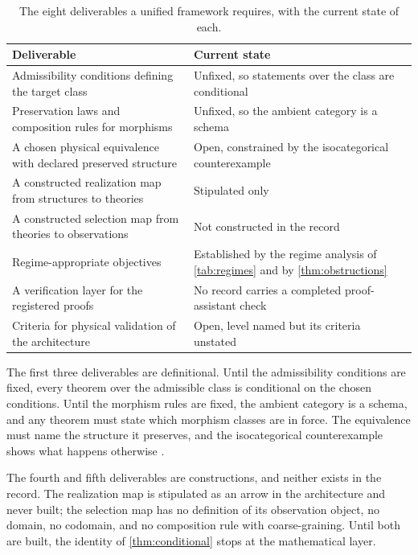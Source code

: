 \documentclass[11pt,letterpaper]{article}
\theoremstyle{definition}
\begin{document}
\begin{table}[htbp]
\caption{The eight deliverables a unified framework requires, with the current state of each.}
\label{tab:requirements}
\small
\begin{tabularx}{\textwidth}{>{\hsize=0.74\hsize\raggedright\arraybackslash}X >{\hsize=1.26\hsize\raggedright\arraybackslash}X}
\toprule
Deliverable & Current state \\
\midrule
Admissibility conditions defining the target class & Unfixed, so statements over the class are conditional \\
Preservation laws and composition rules for morphisms & Unfixed, so the ambient category is a schema \\
A chosen physical equivalence with declared preserved structure & Open, constrained by the isocategorical counterexample \\
A constructed realization map from structures to theories & Stipulated only \\
A constructed selection map from theories to observations & Not constructed in the record \\
Regime-appropriate objectives & Established by the regime analysis of \cref{tab:regimes} and by \cref{thm:obstructions} \\
A verification layer for the registered proofs & No record carries a completed proof-assistant check \\
Criteria for physical validation of the architecture & Open, level named but its criteria unstated \\
\bottomrule
\end{tabularx}
\end{table}

The first three deliverables are definitional. Until the admissibility conditions are fixed, every theorem over the admissible class is conditional on the chosen conditions. Until the morphism rules are fixed, the ambient category is a schema, and any theorem must state which morphism classes are in force. The equivalence must name the structure it preserves, and the isocategorical counterexample shows what happens otherwise \cite{corpus-12}.

The fourth and fifth deliverables are constructions, and neither exists in the record. The realization map is stipulated as an arrow in the architecture and never built; the selection map has no definition of its observation object, no domain, no codomain, and no composition rule with coarse-graining. Until both are built, the identity of \cref{thm:conditional} stops at the mathematical layer.
\end{document}
